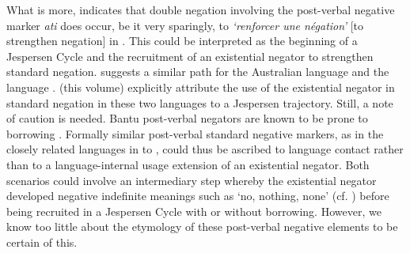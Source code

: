\documentclass[output=paper]{langsci/langscibook}
\begin{document}
\z\z
%
What is more, \citet[378]{Mertens1938} indicates that double negation
involving the post-verbal negative marker \textit{ati} does occur, be it
very sparingly, to \textit{`renforcer une n{\'e}gation'} [to strengthen
negation] in . This could be interpreted as the beginning of a
Jespersen Cycle and the recruitment of an existential negator to strengthen
standard negation. \citet{Croft1991} suggests a similar path for the
Australian language  and the  language .
\citet{AuweraKrasnoukhova2019} (this volume) %
explicitly attribute the use of the
existential negator in standard negation in these two languages to a
Jespersen trajectory. Still, a note of caution is needed. Bantu post-verbal
negators are known to be prone to borrowing \citep[180]{Nurse2008}.
Formally similar post-verbal standard negative markers, as in the closely
related languages in  to
, could thus be ascribed to language contact
rather than to a language-internal usage extension of an existential
negator. Both scenarios could involve an intermediary step whereby the
existential negator developed negative indefinite meanings such as `no,
nothing, none' (cf. ) before being recruited in a Jespersen Cycle with or without borrowing. However, we know too little about the etymology of these post-verbal negative elements to be certain of this.
\end{document}
